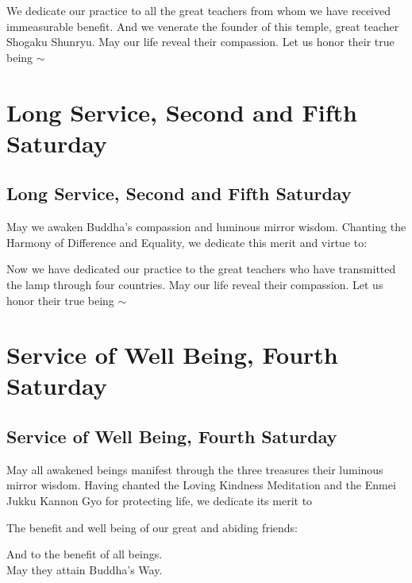 \documentclass{chantbook}
\begin{document}
\begin{services}
\begin{service}
\femaleAncestors

\kokyo We dedicate our practice to all the great teachers from whom we have
received immeasurable benefit. And we venerate the founder of this temple,
great teacher Shogaku Shunryu. May our life reveal their compassion. Let us
honor their true being $\sim$ \largebell
\end{service}

\part{Long Service, Second and Fifth Saturday}
\chapter{Long Service, Second and Fifth Saturday}

\begin{service}
\kokyo \makaHannyaHaramittaShingyo
\kokyo \shosaimyoKichijoDharani
\kokyo {}
\sangha \allBuddhas
\kokyo \harmonyOfDifferenceAndEquality
\kokyo May we awaken Buddha's compassion and luminous mirror wisdom. Chanting
the Harmony of Difference and Equality, we dedicate this merit and virtue to:

\ancestorsLong

\kokyo Now we have dedicated our practice to the great teachers who have
transmitted the lamp through four countries. May our life reveal their
compassion. Let us honor their true being $\sim$ \largebell
\end{service}

\part{Service of Well Being, Fourth Saturday}
\chapter{Service of Well Being, Fourth Saturday}
\begin{service}
\kokyo \makaHannyaHaramittaShingyo
\kokyo \shosaimyoKichijoDharani
\kokyo {}
\kokyo \lovingKindnessMeditation
\kokyo \enmeiJukkuKannonGyo
\kokyo May all awakened beings manifest through the three treasures their
luminous mirror wisdom. Having chanted the Loving Kindness Meditation and the
Enmei Jukku Kannon Gyo for protecting life, we dedicate its merit to

The benefit and well being of our great and abiding friends: \hrulefill

And to the benefit of all beings.\\
May they attain Buddha's Way. \largebell

\end{service}

\end{services}
\end{document}
